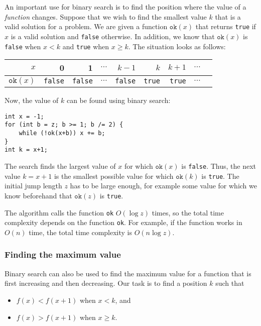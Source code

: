 An important use for binary search is
to find the position where the value of a \emph{function} changes.
Suppose that we wish to find the smallest value $k$
that is a valid solution for a problem.
We are given a function $\texttt{ok}(x)$
that returns \texttt{true} if $x$ is a valid solution
and \texttt{false} otherwise.
In addition, we know that $\texttt{ok}(x)$ is \texttt{false}
when $x<k$ and \texttt{true} when $x \ge k$.
The situation looks as follows:

\begin{center}
\begin{tabular}{r|rrrrrrrr}
$x$ & 0 & 1 & $\cdots$ & $k-1$ & $k$ & $k+1$ & $\cdots$ \\
\hline
$\texttt{ok}(x)$ & \texttt{false} & \texttt{false}
& $\cdots$ & \texttt{false} & \texttt{true} & \texttt{true} & $\cdots$ \\
\end{tabular}
\end{center}

\noindent
Now, the value of $k$ can be found using binary search:

\begin{lstlisting}
int x = -1;
for (int b = z; b >= 1; b /= 2) {
    while (!ok(x+b)) x += b;
}
int k = x+1;
\end{lstlisting}

The search finds the largest value of $x$ for which
$\texttt{ok}(x)$ is \texttt{false}.
Thus, the next value $k=x+1$
is the smallest possible value for which
$\texttt{ok}(k)$ is \texttt{true}.
The initial jump length $z$ has to be
large enough, for example some value
for which we know beforehand that $\texttt{ok}(z)$ is \texttt{true}.

The algorithm calls the function \texttt{ok}
$O(\log z)$ times, so the total time complexity
depends on the function \texttt{ok}.
For example, if the function works in $O(n)$ time,
the total time complexity is $O(n \log z)$.

\subsubsection{Finding the maximum value}

Binary search can also be used to find
the maximum value for a function that is
first increasing and then decreasing.
Our task is to find a position $k$ such that

\begin{itemize}
\item
$f(x)<f(x+1)$ when $x<k$, and
\item
$f(x)>f(x+1)$ when $x \ge k$.
\end{itemize}

